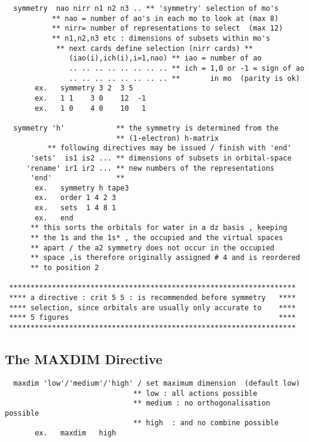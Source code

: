 \documentclass[11pt,fleqn]{article}
\begin{document}
{
\footnotesize
\begin{verbatim} 
  symmetry  nao nirr n1 n2 n3 .. ** 'symmetry' selection of mo's
           ** nao = number of ao's in each mo to look at (max 8)
           ** nirr= number of representations to select  (max 12)
           ** n1,n2,n3 etc : dimensions of subsets within mo's
            ** next cards define selection (nirr cards) **
               (iao(i),ich(i),i=1,nao) ** iao = number of ao
               .. .. .. .. .. .. .. .. ** ich = 1,0 or -1 = sign of ao
               .. .. .. .. .. .. .. .. **       in mo  (parity is ok)
       ex.   symmetry 3 2  3 5
       ex.   1 1    3 0    12  -1
       ex.   1 0    4 0    10   1

  symmetry 'h'            ** the symmetry is determined from the
                          ** (1-electron) h-matrix 
          ** following directives may be issued / finish with 'end'
      'sets'  is1 is2 ... ** dimensions of subsets in orbital-space
     'rename' ir1 ir2 ... ** new numbers of the representations
      'end'               **
       ex.   symmetry h tape3
       ex.   order 1 4 2 3
       ex.   sets  1 4 8 1
       ex.   end
      ** this sorts the orbitals for water in a dz basis , keeping
      ** the 1s and the 1s* , the occupied and the virtual spaces
      ** apart / the a2 symmetry does not occur in the occupied
      ** space ,is therefore originally assigned # 4 and is reordered
      ** to position 2

 *******************************************************************
 **** a directive : crit 5 5 : is recommended before symmetry   ****
 **** selection, since orbitals are usually only accurate to    ****
 **** 5 figures                                                 ****
 *******************************************************************
\end{verbatim}
}

\subsection{The MAXDIM Directive}

{
\footnotesize
\begin{verbatim} 
  maxdim 'low'/'medium'/'high' / set maximum dimension  (default low)
                              ** low : all actions possible
                              ** medium : no orthogonalisation possible
                              ** high  : and no combine possible
       ex.   maxdim   high
\end{verbatim}
}
\end{document}
